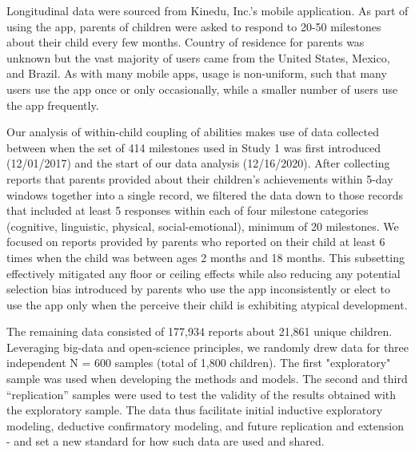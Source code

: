 \documentclass[man, floatsintext]{apa7}
\begin{document}
Longitudinal data were sourced from Kinedu, Inc.'s mobile application. As part of using the app, parents of children were asked to
respond to 20-50 milestones about their child every few months. Country of residence for parents was unknown but the vast majority of users came from the United States, Mexico, and Brazil. As with
many mobile apps, usage is non-uniform, such that many users use the app
once or only occasionally, while a smaller number of users use the app frequently.


Our analysis of within-child coupling of abilities makes use of data collected between
when the set of 414 milestones used in Study 1 was first introduced (12/01/2017) and the start
of our data analysis (12/16/2020). After collecting reports that parents provided about their children's achievements within 5-day windows together into a single record, we filtered the data down to those records that included at least 5
responses within each of four milestone categories (cognitive, linguistic, physical,
social-emotional), minimum of 20 milestones. We focused on reports provided by parents who reported on their child at least 6 times when the child was between ages 2 months and 18 months. This subsetting effectively mitigated any floor or ceiling effects while also reducing any potential selection bias introduced by parents who use the app inconsistently or elect to use the app only when the perceive their child is exhibiting atypical development.

The remaining data consisted of 177,934 reports about 21,861 unique children. Leveraging big-data and open-science principles, we randomly drew data for three independent N = 600 samples (total of 1,800 children). The first "exploratory" sample was used when developing the methods and models. The second and third ``replication'' samples were used to test the validity of the results obtained with the exploratory sample. The data thus facilitate initial inductive exploratory modeling, deductive confirmatory modeling, and future replication and extension - and set a new standard for how such data are used and shared.
\end{document}
